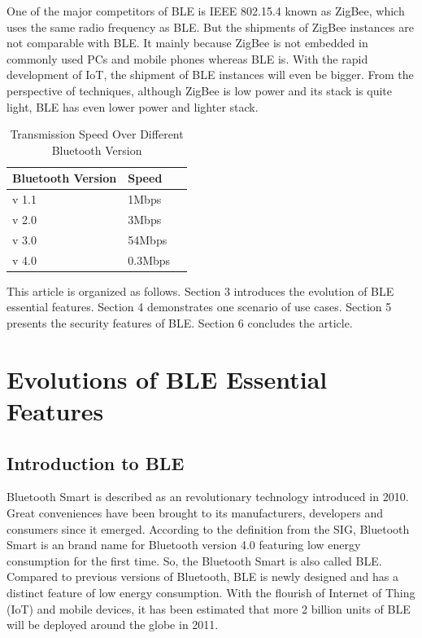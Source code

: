 \documentclass{cseminar}
\begin{document}
One of the major competitors of BLE is IEEE 802.15.4 known as ZigBee, which uses the same radio frequency as BLE. But the shipments of ZigBee instances are not comparable with BLE\cite{BLE05}. It mainly because ZigBee is not embedded in commonly used PCs and mobile phones whereas BLE is. With the rapid development of IoT, the shipment of BLE instances will even be bigger. From the perspective of techniques, although ZigBee is low power and its stack is quite light, BLE has even lower power and lighter stack\cite{BLE02}.

\begin{table}[t]
  \begin{center}
    \begin{tabular}{|l|lr|}
    \hline
    Bluetooth Version & Speed &\\
    \hline
    v 1.1  & 1Mbps &\\
    v 2.0  & 3Mbps &\\
    v 3.0  & 54Mbps &\\
    v 4.0  & 0.3Mbps &\\
    \hline
    \end{tabular}
    \caption{Transmission Speed Over Different Bluetooth Version}
    \label{Bluetooth_Speed}
  \end{center}
\end{table}

This article is organized as follows. Section 3 introduces the evolution of BLE essential features. Section 4 demonstrates one scenario of use cases. Section 5 presents the security features of BLE. Section 6 concludes the article.

\section{Evolutions of BLE Essential Features}
\subsection{Introduction to BLE}
Bluetooth Smart is described as an revolutionary technology introduced in 2010. Great conveniences have been brought to its manufacturers, developers and consumers since it emerged. According to the definition from the SIG, Bluetooth Smart is an brand name for Bluetooth version 4.0 featuring low energy consumption for the first time. So, the Bluetooth Smart is also called BLE. Compared to previous versions of Bluetooth, BLE is newly designed and has a distinct feature of low energy consumption. With the flourish of Internet of Thing (IoT) and mobile devices, it has been estimated that more 2 billion units of BLE will be deployed around the globe in 2011\cite{BLE01}. 
\end{document}
